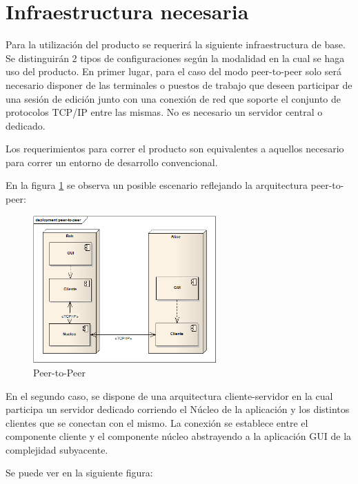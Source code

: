 \documentclass[12pt,a4paper]{article}
\begin{document}
	\section{Infraestructura necesaria}

Para la utilización del producto se requerirá la siguiente infraestructura de base.
Se distinguirán 2 tipos de configuraciones según la modalidad en la cual se haga uso del producto.
En primer lugar, para el caso del modo peer-to-peer solo será necesario disponer de las terminales o puestos de trabajo que deseen participar de una sesión de edición junto con una conexión de red que soporte el conjunto de protocolos TCP/IP entre las mismas. No es necesario un servidor central o dedicado.

Los requerimientos para correr el producto son equivalentes a aquellos necesario para correr un entorno de desarrollo convencional.

En la figura \ref{peer} se observa un posible escenario reflejando la arquitectura peer-to-peer:


	\begin{figure}[!ht]
		\begin{center}
			\includegraphics[width=7cm]{peer-to-peer.png}
			\caption{\label{peer} Peer-to-Peer }
		\end{center}
	\end{figure}



En el segundo caso, se dispone de una arquitectura cliente-servidor en la cual participa un servidor dedicado corriendo el Núcleo de la aplicación y los distintos clientes que se conectan con el mismo. La conexión se establece entre el componente cliente y el componente núcleo abstrayendo a la aplicación GUI de la complejidad subyacente.

Se puede ver en la siguiente figura:
\end{document}
